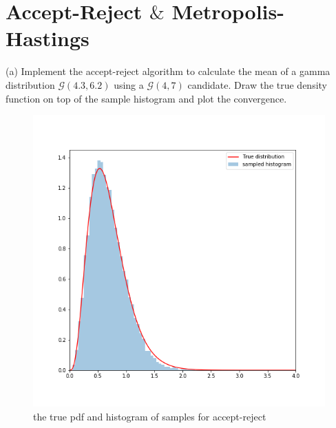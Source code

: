 \documentclass{article}
\begin{document}
\newpage
\section{Accept-Reject $\&$ Metropolis-Hastings}
(a) Implement the accept-reject algorithm to calculate the mean of a gamma distribution $\mathcal{G}(4.3,6.2)$ using a $\mathcal{G}(4,7)$ candidate. Draw the true density function on top of the sample histogram and plot the convergence.

\begin{figure}[h!]
\centering
\includegraphics[scale=0.35]{h4p3a4.png}
\caption{ the true pdf and histogram of samples for accept-reject}
\end{figure}
\end{document}
